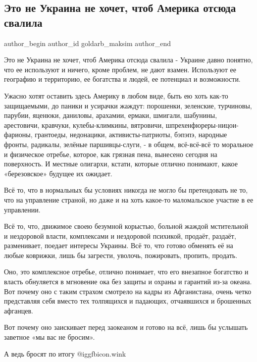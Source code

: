  
 
 
 
 
 
\subsection{Это не Украина не хочет, чтоб Америка отсюда свалила}
\label{sec:15_09_2021.fb.goldarb_maksim.1.ukraina_amerika_svalila}
 
\ifcmt
 author_begin
   author_id goldarb_maksim
 author_end
\fi

Это не Украина не хочет, чтоб Америка отсюда свалила - Украине давно понятно,
что ее используют и ничего, кроме проблем, не дают взамен. Используют ее
географию и территорию, ее богатства и людей, ее потенциал и возможности. 

Ужасно хотят оставить здесь Америку в любом виде, быть ею хоть как-то
защищаемыми, до паники и усирачки жаждут: порошенки, зеленские, турчиновы,
парубии, яценюки, даниловы, арахамии, ермаки, шмигали, шабунины, арестовичи,
кравчуки, кулебы-климкины, вятровичи, шпрехенфюреры-ницои-фарионы, грантоеды,
недонацики, активисты-патриоты, бэпэпэ, народные фронты, радикалы, зелёные
паршивцы-слуги, - в общем, всё-всё-всё то моральное и физическое отребье,
которое, как грязная пена, вынесено сегодня на поверхность. И местные олигархи,
кстати, которые отлично понимают, какое «березовское» будущее их ожидает. 

Всё то, что в нормальных бы условиях никогда не могло бы претендовать не то,
что на управление страной, но даже и на хоть какое-то маломальское участие в ее
управлении. 

Всё то, что, движимое своею безумной корыстью, больной жаждой мстительной и
нездоровой власти, комплексами и нездоровой психикой, продаёт, раздаёт,
разменивает, поедает интересы Украины. Всё то, что готово обменять её на любые
коврижки, лишь бы загрести, уволочь, пожировать, пропить, продать. 

Оно, это комплексное отребье, отлично понимает, что его внезапное богатство и
власть обнуляется в мгновение ока без защиты и охраны и гарантий из-за океана.
Вот почему оно с таким страхом смотрело на кадры из Афганистана, очень четко
представляя себя вместо тех толпящихся и падающих, отчаявшихся и брошенных
афганцев. 

Вот почему оно заискивает перед заокеаном и готово на всё, лишь бы услышать
заветное «мы вас не бросим». 

А ведь бросят по итогу  @igg{fbicon.wink} 
